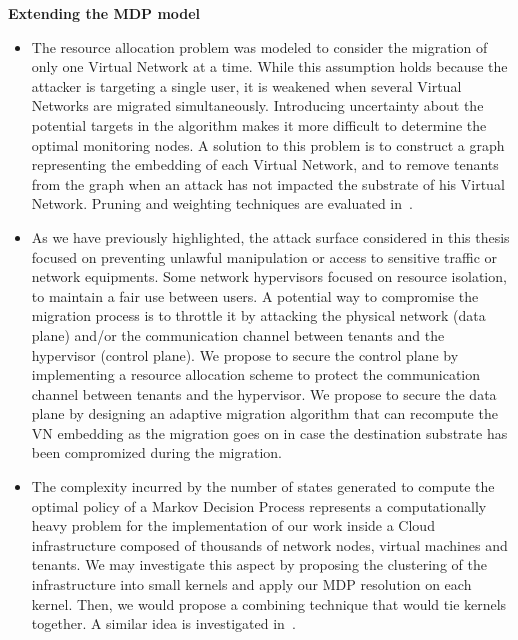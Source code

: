\textbf{Extending the MDP model}
\begin{itemize}
    \item 
    The resource allocation problem was modeled to consider the migration of only one Virtual Network at a time. While this assumption holds because the attacker is targeting a single user, it is weakened when several Virtual Networks are migrated simultaneously. Introducing uncertainty about the potential targets in the algorithm makes it more difficult to determine the optimal monitoring nodes. A solution to this problem is to construct a graph representing the embedding of each Virtual Network, and to remove tenants from the graph when an attack has not impacted the substrate of his Virtual Network. Pruning and weighting techniques are evaluated in~\cite{pruning-secu}.

    \item 
    As we have previously highlighted, the attack surface considered in this thesis focused on preventing unlawful manipulation or access to sensitive traffic or network equipments. Some network hypervisors focused on resource isolation, to maintain a fair use between users. A potential way to compromise the migration process is to throttle it by attacking the physical network (data plane) and/or the communication channel between tenants and the hypervisor (control plane). We propose to secure the control plane by implementing a resource allocation scheme to protect the communication channel between tenants and the hypervisor. We propose to secure the data plane by designing an adaptive migration algorithm that can recompute the VN embedding as the migration goes on in case the destination substrate has been compromized during the migration. 

    \item 
    The complexity incurred by the number of states generated to compute the optimal policy of a Markov Decision Process represents a computationally heavy problem for the implementation of our work inside a Cloud infrastructure composed of thousands of network nodes, virtual machines and tenants. We may investigate this aspect by proposing the clustering of the infrastructure into small kernels and apply our MDP resolution on each kernel. Then, we would propose a combining technique that would tie kernels together. A similar idea is investigated in~\cite{POMDP-clustering}.


\end{itemize}
